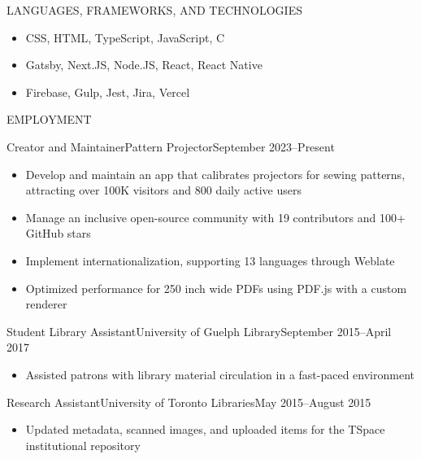 \documentclass[]{mcdowellcv}
\begin{document}
\makeheader

\begin{cvsection}{LANGUAGES, FRAMEWORKS, AND TECHNOLOGIES}
  \begin{cvsubsection}{}{}{}
    \begin{itemize}
      \item CSS, HTML, TypeScript, JavaScript, C
      \item Gatsby, Next.JS, Node.JS, React, React Native
      \item Firebase, Gulp, Jest, Jira, Vercel
    \end{itemize}
  \end{cvsubsection}
\end{cvsection}

\begin{cvsection}{EMPLOYMENT}
  \begin{cvsubsection}{Creator and Maintainer}{Pattern Projector}{September 2023--Present}
    \begin{itemize}
      \item Develop and maintain an app that calibrates projectors for sewing patterns,
            attracting over 100K visitors and 800 daily active users
      \item Manage an inclusive open-source community with 19 contributors and 100+ GitHub
            stars
      \item Implement internationalization, supporting 13 languages through Weblate
      \item Optimized performance for 250 inch wide PDFs using PDF.js with a custom
            renderer
    \end{itemize}
  \end{cvsubsection}

  \begin{cvsubsection}{Student Library Assistant}{University of Guelph Library}{September 2015--April 2017}
    \begin{itemize}
      \item Assisted patrons with library material circulation in a fast-paced environment
    \end{itemize}
  \end{cvsubsection}

  \begin{cvsubsection}{Research Assistant}{University of Toronto Libraries}{May 2015--August 2015}
    \begin{itemize}
      \item Updated metadata, scanned images, and uploaded items for the TSpace
            institutional repository
    \end{itemize}
  \end{cvsubsection}


\end{cvsection}
\end{document}
